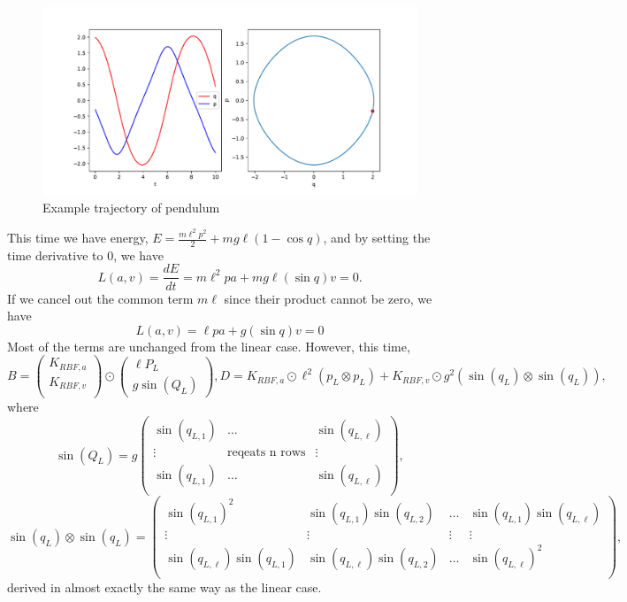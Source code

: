 \documentclass{statsmsc}
\begin{document}
\begin{figure}[H] 
  \includegraphics[width=0.6\linewidth]{../codes/figures/pendulum_trajectory_1D.pdf}
  \centering
  \caption{Example trajectory of pendulum}
  \label{fig:pendulum_trajectory}
\end{figure}

This time we have energy, $E=\frac{m\ell^2p^2}{2}+mg\ell(1-\cos q)$, and by setting the time derivative to 0, we have 
$$L(a, v)=\frac{dE}{dt}=m\ell^2pa+mg\ell(\sin q)v=0.$$
If we cancel out the common term $m\ell$ since their product cannot be zero, we have $$L(a,v)=\ell pa+g(\sin q)v=0$$
Most of the terms are unchanged from the linear case. 
However, this time, 
$$
B=\begin{pmatrix}
    K_{RBF,a} \\ K_{RBF,v} \\
\end{pmatrix}\odot \begin{pmatrix}
    \ell P_L \\ g\sin(Q_L)
\end{pmatrix}, D=K_{RBF,a}\odot \ell^2(p_L\otimes p_L) + K_{RBF,v}\odot g^2(\sin(q_L)\otimes \sin(q_L)),
$$
where 
$$
\sin(Q_L) = g\begin{pmatrix}
  \sin(q_{L,1})  & \dots & \sin(q_{L,\ell})  \\
  \vdots & \text{reqeats n rows} &  \vdots\\
  \sin(q_{L,1})  & \dots & \sin(q_{L,\ell})  \\
\end{pmatrix},
$$
$$
\sin(q_L)\otimes \sin(q_L)=\begin{pmatrix}
  \sin(q_{L,1})^2 & \sin(q_{L,1})\sin(q_{L,2}) & \dots & \sin(q_{L,1})\sin(q_{L,\ell}) \\
  \vdots & \vdots & \vdots & \vdots \\
  \sin(q_{L,\ell})\sin(q_{L,1}) & \sin(q_{L,\ell})\sin(q_{L,2}) & \dots & \sin(q_{L,\ell})^2 \\
\end{pmatrix},
$$
derived in almost exactly the same way as the linear case. 
\end{document}
